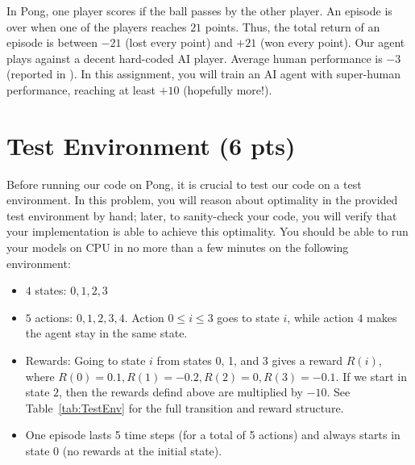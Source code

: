 \documentclass{article}
\begin{document}
In Pong, one player scores if the ball passes by the other player. An episode is over when one of the players reaches $21$ points. Thus, the total return of an episode is between $-21$ (lost every point) and $+21$ (won every point). Our agent plays against a decent hard-coded AI player. Average human performance is $-3$ (reported in \cite{mnih-atari-2013}). In this assignment, you will train an AI agent with super-human performance, reaching at least $+10$ (hopefully more!).

\newpage
\section{Test Environment (6 pts)}
Before running our code on Pong, it is crucial to test our code on a test environment. In this problem, you will reason about optimality in the provided test environment by hand; later, to sanity-check your code, you will verify that your implementation is able to achieve this optimality. You should be able to run your models on CPU in no more than a few minutes on the following environment:

\begin{itemize}
\item $ 4 $ states: $ 0, 1, 2, 3 $
\item $ 5 $ actions: $ 0, 1, 2, 3, 4 $. Action $ 0 \leq i \leq 3 $ goes to state $ i $, while action $ 4 $ makes the agent stay in the same state.
\item Rewards: Going to state $ i $ from states 0, 1, and 3 gives a reward $R(i) $, where $R(0) = 0.1, R(1) = -0.2, R(2) = 0, R(3) = -0.1 $. If we start in state $ 2 $, then the rewards defind above are multiplied by $ - 10 $.  See Table~\ref{tab:TestEnv} for the full transition and reward structure.
\item One episode lasts 5 time steps (for a total of 5 actions) and always starts in state $ 0 $ (no rewards at the initial state).
\end{itemize}
\end{document}
